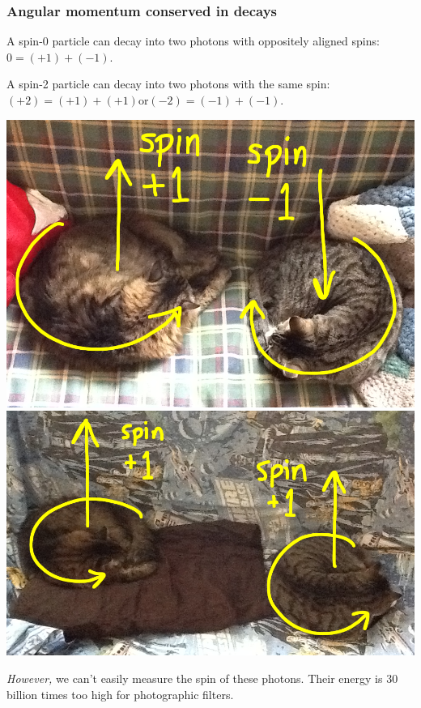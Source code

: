 \documentclass[compress]{beamer}
\begin{document}
\begin{frame}
\frametitle{Angular momentum conserved in decays}

A spin-0 particle can decay into two photons with oppositely aligned spins: $0 = (+1) + (-1)$.

\vfill
A spin-2 particle can decay into two photons with the same spin: $(+2) = (+1) + (+1)$\hspace{0.5 cm}or\hspace{0.5 cm}$(-2) = (-1) + (-1)$.

\vfill
\includegraphics[height=3.4 cm]{spin-0.png} \hfill \includegraphics[height=3.4 cm]{spin-2.png}

\vfill
{\it However,} we can't easily measure the spin of these photons.  Their energy is 30 billion times too high for photographic filters.
\end{frame}
\end{document}
